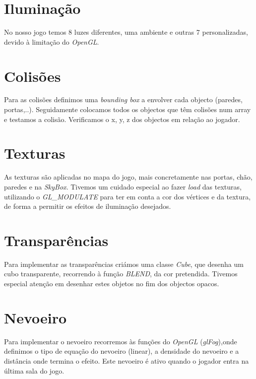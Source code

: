 \documentclass[12pt]{article}
\begin{document}
\section{Iluminação}
No nosso jogo temos 8 luzes diferentes, uma ambiente e outras 7 personalizadas, devido à limitação do \emph{OpenGL}. 

\section{Colisões}
Para as colisões definimos uma \emph{bounding box} a envolver cada objecto (paredes, portas,..). Seguidamente colocamos todos os objectos que têm colisões num array e testamos a colisão. Verificamos o x, y, z dos objectos em relação ao jogador.
\section{Texturas}
As texturas são aplicadas no mapa do jogo, mais concretamente nas portas, chão, paredes e na \emph{SkyBox}. Tivemos um cuidado especial ao fazer \emph{load} das texturas, utilizando o \emph{GL\_MODULATE} para ter em conta a cor dos vértices e da textura, de forma a permitir os efeitos de iluminação desejados.

\section{Transparências}
Para implementar as transparências criámos uma classe \emph{Cube}, que desenha um cubo transparente, recorrendo à função \emph{BLEND}, da cor pretendida. Tivemos especial atenção em desenhar estes objetos no fim dos objectos opacos.   

\section{Nevoeiro}
Para implementar o nevoeiro recorremos às funções do \emph{OpenGL} (\emph{glFog}),onde definimos o tipo de equação do nevoeiro (linear), a densidade do nevoeiro e a distância onde termina o efeito. Este nevoeiro é ativo quando o jogador entra na última sala do jogo.
\end{document}
